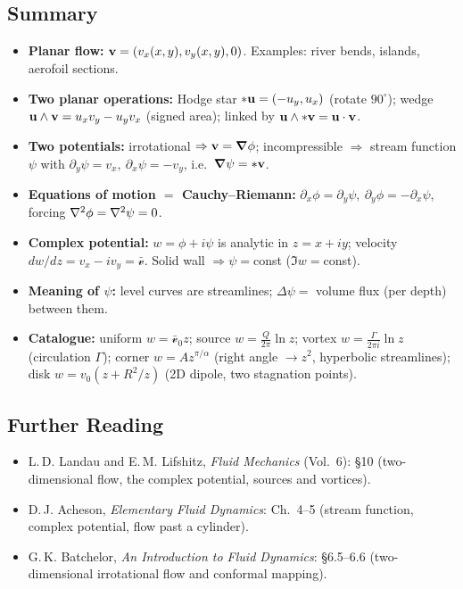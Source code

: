 \documentclass[../main.tex]{subfiles}
\begin{document}
\subsection*{Summary}
\begin{itemize}
  \item \textbf{Planar flow:} $\mathbf{v}=(v_x(x,y),v_y(x,y),0)$. Examples: river bends, islands, aerofoil sections.
  \item \textbf{Two planar operations:} Hodge star $\ast\mathbf{u}=(-u_y,u_x)$ (rotate $90^\circ$); wedge $\mathbf{u}\wedge\mathbf{v}=u_xv_y-u_yv_x$ (signed area); linked by $\mathbf{u}\wedge\ast\mathbf{v}=\mathbf{u}\cdot\mathbf{v}$.
  \item \textbf{Two potentials:} irrotational $\Rightarrow\mathbf{v}=\grad\phi$; incompressible $\Rightarrow$ stream function $\psi$ with $\partial_y\psi=v_x,\ \partial_x\psi=-v_y$, i.e.\ $\grad\psi=\ast\mathbf{v}$.
  \item \textbf{Equations of motion $=$ Cauchy--Riemann:} $\partial_x\phi=\partial_y\psi,\ \partial_y\phi=-\partial_x\psi$, forcing $\nabla^2\phi=\nabla^2\psi=0$.
  \item \textbf{Complex potential:} $w=\phi+i\psi$ is analytic in $z=x+iy$; velocity $dw/dz=v_x-iv_y=\bar{\mathcal v}$. Solid wall $\Rightarrow\psi=$const ($\Im w=$const).
  \item \textbf{Meaning of $\psi$:} level curves are streamlines; $\Delta\psi=$ volume flux (per depth) between them.
  \item \textbf{Catalogue:} uniform $w=\bar{\mathcal v}_0 z$; source $w=\tfrac{Q}{2\pi}\ln z$; vortex $w=\tfrac{\Gamma}{2\pi i}\ln z$ (circulation $\Gamma$); corner $w=Az^{\pi/\alpha}$ (right angle $\to z^2$, hyperbolic streamlines); disk $w=v_0(z+R^2/z)$ (2D dipole, two stagnation points).
\end{itemize}

\subsection*{Further Reading}
\begin{itemize}
  \item L.\,D. Landau and E.\,M. Lifshitz, \textit{Fluid Mechanics} (Vol.\ 6): \S10 (two-dimensional flow, the complex potential, sources and vortices).
  \item D.\,J. Acheson, \textit{Elementary Fluid Dynamics}: Ch.\ 4--5 (stream function, complex potential, flow past a cylinder).
  \item G.\,K. Batchelor, \textit{An Introduction to Fluid Dynamics}: \S6.5--6.6 (two-dimensional irrotational flow and conformal mapping).
\end{itemize}
\end{document}
